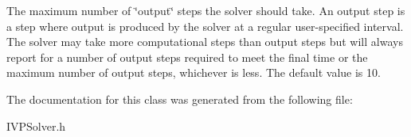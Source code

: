 The maximum number of \char`\"{}output\char`\"{} steps the solver should take. An output step is a step where output is produced by the solver at a regular user-\/specified interval. The solver may take more computational steps than output steps but will always report for a number of output steps required to meet the final time or the maximum number of output steps, whichever is less. The default value is 10. 

The documentation for this class was generated from the following file\+:\begin{DoxyCompactItemize}
\item 
I\+V\+P\+Solver.\+h\end{DoxyCompactItemize}
